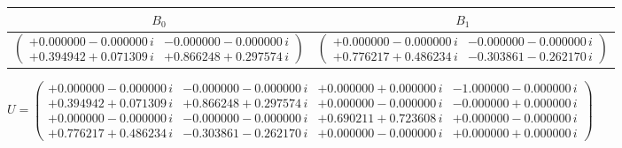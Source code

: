\documentclass[10pt,a4paper]{article}
\begin{document}
\begin{center}\begin{tabular}{cc}
\toprule $B_0$ & $B_1$ \\ \midrule
$\begin{pmatrix}+0.000000-0.000000\,i & -0.000000-0.000000\,i\\ +0.394942+0.071309\,i & +0.866248+0.297574\,i\end{pmatrix}$ & $\begin{pmatrix}+0.000000-0.000000\,i & -0.000000-0.000000\,i\\ +0.776217+0.486234\,i & -0.303861-0.262170\,i\end{pmatrix}$ \\
\bottomrule\end{tabular}\end{center}
\begin{center}$U=\begin{pmatrix}+0.000000-0.000000\,i & -0.000000-0.000000\,i & +0.000000+0.000000\,i & -1.000000-0.000000\,i\\ +0.394942+0.071309\,i & +0.866248+0.297574\,i & +0.000000-0.000000\,i & -0.000000+0.000000\,i\\ +0.000000-0.000000\,i & -0.000000-0.000000\,i & +0.690211+0.723608\,i & +0.000000-0.000000\,i\\ +0.776217+0.486234\,i & -0.303861-0.262170\,i & +0.000000-0.000000\,i & +0.000000+0.000000\,i\end{pmatrix}$\end{center}
\end{document}
